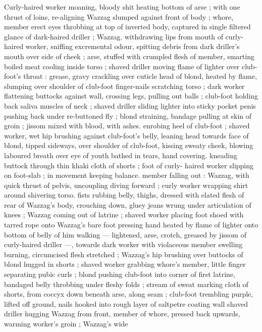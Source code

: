 Curly-haired worker moaning, bloody shit heating bottom of arse ; 
with one thrust of loins, re-aligning Wazzag slumped against front of 
body ; whore, member erect eyes throbbing at top of inverted body, 
captured in single filtered glance of dark-haired driller ; Wazzag. 
withdrawing lips from mouth of curly-haired worker, sniffing 
excremental odour, spitting debris from dark driller's mouth over side 
of cheek ; arse, stuffed with crumpled flesh of member, smarting 
boiled meat cooling inside torso ; shaved driller moving flame of 
lighter over club-foot's throat : grease, gravy crackling over cuticle 
head of blond, heated by flame, slumping over shoulder of club-foot 
finger-nails scratching torso ; dark worker flattening buttocks against 
wall, crossing legs, pulling out balls ; club-foot holding back saliva 
muscles of neck ; shaved driller sliding lighter into sticky pocket 
penis pushing back under re-buttoned fly ; blond straining, bandage 
pulling at skin of groin ; jissom mixed with blood, with ashes. 
enrobing heel of club-foot ; shaved worker, wet hip brushing against 
club-foot's belly, leaning head towards face of blond, tipped 
sideways, over shoulder of club-foot, kissing sweaty cheek, blowing 
laboured breath over eye of youth bathed in tears, hand covering. 
kneading buttock through thin khaki cloth of shorts ; foot of curly- 
haired worker slipping on foot-slab ; in movement keeping balance. 
member falling out : Wazzag, with quick thrust of pelvis, uncoupling 
diving forward ; curly worker wrapping shirt around shivering torso. 
fists rubbing belly, thighs, dressed with elated flesh of rear of 
Wazzag's body, crouching down, gluey jeans wrung under 
articulation of knees ; Wazzag coming out of latrine ; shaved worker 
placing foot shoed with tarred rope onto Wazzag's bare foot 
pressing hand heated by flame of lighter onto bottom of belly of him 
walking --- lightened, arse, crotch, greased by jissom of curly-haired 
driller ---, towards dark worker with violaceous member swelling 
burning, circumcised flesh stretched ; Wazzag's hip brushing over 
buttocks of blond hugged in shorts ; shaved worker grabbing 
whore's member, little finger separating pubic curls ; blond pushing 
club-foot into corner of first latrine, bandaged belly throbbing under 
fleshy folds ; stream of sweat marking cloth of shorts, from coccyx 
down beneath arse, along seam ; club-foot trembling purple, lifted 
off ground, nails hooked into rough layer of saltpetre coating wall 
shaved driller hugging Wazzag from front, member of whore, 
pressed back upwards, warming worker's groin ; Wazzag's wide 
